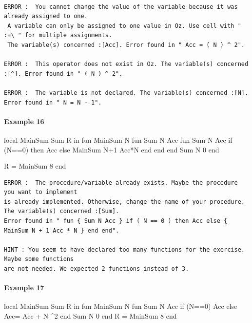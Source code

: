 \documentclass[11pt,a4paper,twoside,openright]{report}
\begin{document}
\begin{lstlisting}

ERROR :  You cannot change the value of the variable because it was already assigned to one.
 A variable can only be assigned to one value in Oz. Use cell with " :=\ " for multiple assignments. 
 The variable(s) concerned :[Acc]. Error found in " Acc = ( N ) ^ 2".

ERROR :  This operator does not exist in Oz. The variable(s) concerned :[^]. Error found in " ( N ) ^ 2".

ERROR :  The variable is not declared. The variable(s) concerned :[N]. Error found in " N = N - 1".
\end{lstlisting}

\paragraph{Example 16}
\begin{OZ}
local MainSum Sum R in
	fun {MainSum N}
		fun {Sum N Acc}
			fun {Sum N Acc}
				if (N==0) then Acc
				else {MainSum N+1 Acc*N} end
			end
	    end
    {Sum N 0}
	end

	R = {MainSum 8}
end

\end{OZ}

\begin{lstlisting}
ERROR :  The procedure/variable already exists. Maybe the procedure you want to implement 
is already implemented. Otherwise, change the name of your procedure. 
The variable(s) concerned :[Sum]. 
Error found in " fun { Sum N Acc } if ( N == 0 ) then Acc else { MainSum N + 1 Acc * N } end end".

HINT : You seem to have declared too many functions for the exercise. Maybe some functions
are not needed. We expected 2 functions instead of 3.
\end{lstlisting}

\paragraph{Example 17}
\begin{OZ}
local MainSum Sum R in
	fun {MainSum N}
		fun {Sum N Acc}
			if (N==0) Acc
			else Acc= Acc + N ^2
	    end
    {Sum N 0}
	end
	R = {MainSum 8}
end

\end{OZ}
\end{document}
